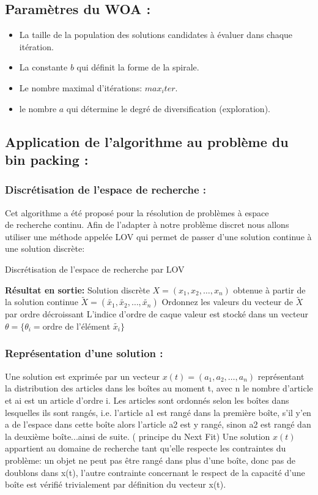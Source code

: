\documentclass[12pt]{article}
\begin{document}
\subsection{Paramètres du WOA :}
\begin{itemize}
    \item La taille de la population des solutions candidates à évaluer dans chaque itération.
    \item La constante \(b\) qui définit la forme de la spirale.
    \item Le nombre maximal d’itérations: \(max_iter\).
    \item le nombre \(a\) qui détermine le degré de diversification (exploration).    
\end{itemize}
\subsection{Application de l’algorithme au problème du bin packing :}
\subsubsection{Discrétisation de l'espace de recherche :}
Cet algorithme a été proposé pour la résolution de problèmes à espace \\ de recherche continu. Afin de l’adapter à notre problème discret nous allons utiliser une méthode appelée LOV qui permet de passer d’une solution continue à une solution discrète:\\
\begin{algorithm}[H]
    \caption{Discrétisation de l'espace de recherche par LOV}
    \begin{algorithmic}
        \STATE \textbf{Résultat en sortie:} Solution discrète \(X = (x_1, x_2, \dots, x_n)\) obtenue à partir de la solution continue \(\tilde{X} = (\tilde{x_1}, \tilde{x_2}, \dots, \tilde{x_n})\)\;
        \STATE Ordonnez les valeurs du vecteur de \(\tilde{X}\) par ordre décroissant\;
        \STATE L'indice d'ordre de caque valeur est stocké dans un vecteur \(\theta = \{ \theta_i = \text{ordre de l'élément } \tilde{x_i}\}\)\;
    \end{algorithmic}  
\end{algorithm}
\subsubsection{Représentation d’une solution :}
Une solution est exprimée par un vecteur \(x(t)=(a_1, a_2, …, a_n)\) représentant la distribution des articles dans les boîtes au moment t, avec n le nombre d’article et ai est un article d’ordre i. Les articles sont ordonnés selon les boîtes dans lesquelles ils sont rangés, i.e. l’article a1 est rangé dans la première boîte, s’il y’en a de l’espace dans cette boîte alors l’article a2 est y rangé, sinon a2 est rangé dan la deuxième boîte...ainsi de suite. ( principe du Next Fit) 
Une solution \(x(t)\) appartient au domaine de recherche tant qu’elle respecte les contraintes du problème: un objet ne peut pas être rangé dans plus d’une boîte, donc pas de doublons dans x(t), l’autre contrainte concernant le respect de la capacité d’une boîte est vérifié trivialement par définition du vecteur x(t).
\end{document}
